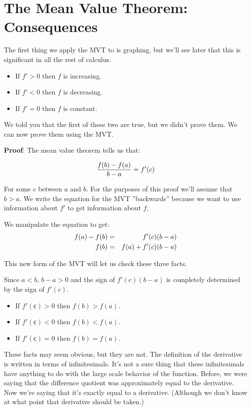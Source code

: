 \documentclass[a4paper,12pt]{article}
\begin{document}
\section{The Mean Value Theorem: Consequences}

The first thing we apply the MVT to is graphing, but we'll see later that this is significant in all the rest of calculus.

\begin{itemize}
	\item If $f' > 0$ then $f$ is increasing.
	\item If $f' < 0$ then $f$ is decreasing.
	\item If $f' = 0$ then $f$ is constant.
\end{itemize}

We told you that the first of these two are true, but we didn't prove them. We can now prove them using the MVT.

\textbf{Proof}: The mean value theorem tells us that:

\[
	\frac{f(b) - f(a)}{b-a} = f'(c) \notag
\]

For some $c$ between $a$ and $b$. For the purposes of this proof we'll assume that $b > a$.
We write the equation for the MVT ''backwards'' because we want to use information about $f'$ to get information about $f$. 

We manipulate the equation to get:
\begin{eqnarray}
f(a) - f(b) &=& f'(c)(b-a) \notag \\
f(b) &=& f(a)+f'(c)(b-a) \notag
\end{eqnarray}

This new form of the MVT will let us check these three facts. 

Since $a<b$, $b-a>0$ and the sign of $f'(c)(b-a)$ is completely determined 
by the sign of $f'(c)$.
\begin{itemize}
	\item If $f'(с) > 0$ then $f(b) > f(a)$.
	\item If $f'(с) < 0$ then $f(b) < f(a)$.
	\item If $f'(с) = 0$ then $f(b) = f(a)$.
\end{itemize}

These facts may seem obvious, but they are not. The definition of the derivative is written in terms of infinitesimals. It's not a sure thing that these infinitesimals have anything to do with the large scale behavior of the function. Before, we were saying that the difference quotient was approximately equal to the derivative. Now we're saying that it's exactly equal to a derivative. (Although we don't know at what point that derivative should be taken.) 
\end{document}
